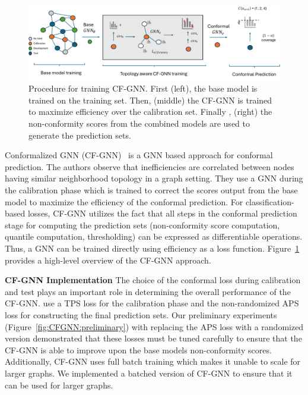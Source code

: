 \begin{figure}
    \centering
    \includegraphics[width=\linewidth]{graphConformal/figures/CFGNN.pdf}
    \caption{Procedure for training CF-GNN. First (left), the base model is trained on the training set. Then, (middle) the CF-GNN is trained to maximize efficiency over the calibration set. Finally , (right) the non-conformity scores from the combined models are used to generate the prediction sets.}
    \label{fig:conformalized_gnn}
\end{figure}

Conformalized GNN (CF-GNN)~\citep{huang2024uncertainty} is a GNN based approach for conformal prediction.
The authors observe that inefficiencies are correlated between nodes having similar neighborhood topology in a graph setting.
They use a GNN during the calibration phase which is trained to correct the scores output from the base model to maximize the efficiency of the conformal prediction.
For classification-based losses, CF-GNN utilizes the fact that all steps in the conformal prediction stage for computing the prediction sets (non-conformity score computation, quantile computation, thresholding) can be expressed as differentiable operations.
Thus, a GNN can be trained directly using efficiency as a loss function.
Figure~\ref{fig:conformalized_gnn} provides a high-level overview of the CF-GNN approach.

\noindent \textbf{CF-GNN Implementation}
The choice of the conformal loss during calibration and test plays an important role in determining the overall performance of the CF-GNN.
\citet{huang2024uncertainty} use a TPS loss for the calibration phase and the non-randomized APS loss for constructing the final prediction sets.
Our preliminary experiments (Figure~\ref{fig:CFGNN:preliminary}) with replacing the APS loss with a randomized version demonstrated that these losses must be tuned carefully to ensure that the CF-GNN is able to improve upon the base models non-conformity scores.
Additionally, CF-GNN uses full batch training which makes it unable to scale for larger graphs.
We implemented a batched version of CF-GNN to ensure that it can be used for larger graphs.

